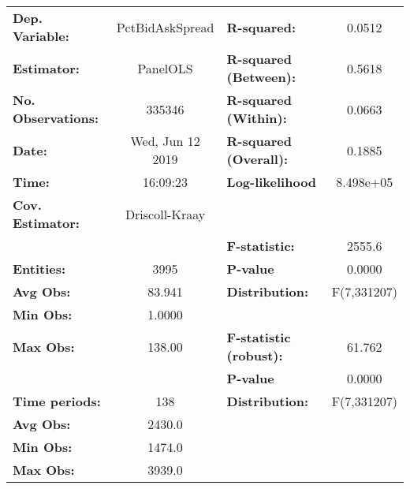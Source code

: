 \begin{center}
\begin{tabular}{lclc}
\toprule
\textbf{Dep. Variable:}                 &  PctBidAskSpread   & \textbf{  R-squared:         }   &      0.0512      \\
\textbf{Estimator:}                     &      PanelOLS      & \textbf{  R-squared (Between):}  &      0.5618      \\
\textbf{No. Observations:}              &       335346       & \textbf{  R-squared (Within):}   &      0.0663      \\
\textbf{Date:}                          &  Wed, Jun 12 2019  & \textbf{  R-squared (Overall):}  &      0.1885      \\
\textbf{Time:}                          &      16:09:23      & \textbf{  Log-likelihood     }   &    8.498e+05     \\
\textbf{Cov. Estimator:}                &   Driscoll-Kraay   & \textbf{                     }   &                  \\
\textbf{}                               &                    & \textbf{  F-statistic:       }   &      2555.6      \\
\textbf{Entities:}                      &        3995        & \textbf{  P-value            }   &      0.0000      \\
\textbf{Avg Obs:}                       &       83.941       & \textbf{  Distribution:      }   &   F(7,331207)    \\
\textbf{Min Obs:}                       &       1.0000       & \textbf{                     }   &                  \\
\textbf{Max Obs:}                       &       138.00       & \textbf{  F-statistic (robust):} &      61.762      \\
\textbf{}                               &                    & \textbf{  P-value            }   &      0.0000      \\
\textbf{Time periods:}                  &        138         & \textbf{  Distribution:      }   &   F(7,331207)    \\
\textbf{Avg Obs:}                       &       2430.0       & \textbf{                     }   &                  \\
\textbf{Min Obs:}                       &       1474.0       & \textbf{                     }   &                  \\
\textbf{Max Obs:}                       &       3939.0       & \textbf{                     }   &                  \\

\end{tabular}
\end{center}
